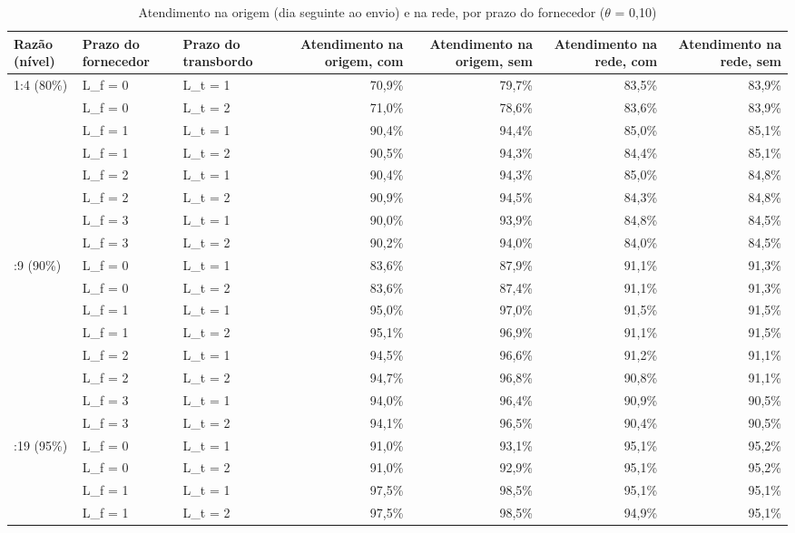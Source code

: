 \begin{table}[htbp]
\centering
\small
\caption{Atendimento na origem (dia seguinte ao envio) e na rede, por prazo do fornecedor ($\theta$ = 0,10)}
\label{tab:tbr_servico}
\begin{tabular}{lllrrrr}
\toprule
Razão (nível) & Prazo do fornecedor & Prazo do transbordo & Atendimento na origem, com & Atendimento na origem, sem & Atendimento na rede, com & Atendimento na rede, sem \\
\midrule
1:4 (80\%) & L\_f = 0 & L\_t = 1 & 70,9\% & 79,7\% & 83,5\% & 83,9\% \\
 & L\_f = 0 & L\_t = 2 & 71,0\% & 78,6\% & 83,6\% & 83,9\% \\
 & L\_f = 1 & L\_t = 1 & 90,4\% & 94,4\% & 85,0\% & 85,1\% \\
 & L\_f = 1 & L\_t = 2 & 90,5\% & 94,3\% & 84,4\% & 85,1\% \\
 & L\_f = 2 & L\_t = 1 & 90,4\% & 94,3\% & 85,0\% & 84,8\% \\
 & L\_f = 2 & L\_t = 2 & 90,9\% & 94,5\% & 84,3\% & 84,8\% \\
 & L\_f = 3 & L\_t = 1 & 90,0\% & 93,9\% & 84,8\% & 84,5\% \\
 & L\_f = 3 & L\_t = 2 & 90,2\% & 94,0\% & 84,0\% & 84,5\% \\
\addlinespace
1:9 (90\%) & L\_f = 0 & L\_t = 1 & 83,6\% & 87,9\% & 91,1\% & 91,3\% \\
 & L\_f = 0 & L\_t = 2 & 83,6\% & 87,4\% & 91,1\% & 91,3\% \\
 & L\_f = 1 & L\_t = 1 & 95,0\% & 97,0\% & 91,5\% & 91,5\% \\
 & L\_f = 1 & L\_t = 2 & 95,1\% & 96,9\% & 91,1\% & 91,5\% \\
 & L\_f = 2 & L\_t = 1 & 94,5\% & 96,6\% & 91,2\% & 91,1\% \\
 & L\_f = 2 & L\_t = 2 & 94,7\% & 96,8\% & 90,8\% & 91,1\% \\
 & L\_f = 3 & L\_t = 1 & 94,0\% & 96,4\% & 90,9\% & 90,5\% \\
 & L\_f = 3 & L\_t = 2 & 94,1\% & 96,5\% & 90,4\% & 90,5\% \\
\addlinespace
1:19 (95\%) & L\_f = 0 & L\_t = 1 & 91,0\% & 93,1\% & 95,1\% & 95,2\% \\
 & L\_f = 0 & L\_t = 2 & 91,0\% & 92,9\% & 95,1\% & 95,2\% \\
 & L\_f = 1 & L\_t = 1 & 97,5\% & 98,5\% & 95,1\% & 95,1\% \\
 & L\_f = 1 & L\_t = 2 & 97,5\% & 98,5\% & 94,9\% & 95,1\% \\

\end{tabular}
\end{table}
